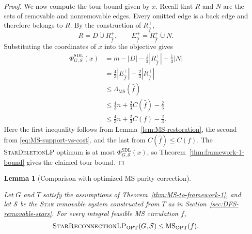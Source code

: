 \documentclass[11pt]{amsart}
\newcommand{\1}{\mathbbm{1}}
\newcommand{\MSopt}{\operatorname{MS}_{\mathrm{OPT}}}
\newcommand{\LPone}{\textsc{StarDeletionLP}}
\newcommand{\LPtwo}{\textsc{StarReconnectionLP}}
\newcommand{\PhiOne}{\Phi^{\mathrm{SDL}}}
\newtheorem{lemma}[theorem]{Lemma}
\begin{document}
\begin{proof}
We now compute the tour bound given by $x$.
Recall that $R$ and $N$ are the sets of removable and
nonremovable edges. Every omitted edge is a back edge and
therefore belongs to $R$. By the construction of
$R_{\widehat f}^+$,
\[
 R=D\mathbin{\dot\cup}R_{\widehat f}^+,
 \qquad
 E_{\widehat f}^+=R_{\widehat f}^+\mathbin{\dot\cup}N.
\]
Substituting the coordinates of $x$ into the objective gives
\begin{equation}
\label{eq:MS-exact-support-comparison}
\begin{aligned}
 \PhiOne_{G,\mathcal S}(x)
 &=m-|D|-\frac13|R_{\widehat f}^+|+\frac13|N|\\
 &=\frac43|E_{\widehat f}^+|-\frac23|R_{\widehat f}^+|\\
 &\le\Lambda_{\mathrm{MS}}(\widehat f)\\
 &\le\frac43n+\frac23C(\widehat f)-\frac23\\
 &\le\frac43n+\frac23C(f)-\frac23.
\end{aligned}
\end{equation}
Here the first inequality follows from
Lemma~\ref{lem:MS-restoration}, the second from
\eqref{eq:MS-support-vs-cost}, and the last from
$C(\widehat f)\le C(f)$.
The \LPone{} optimum is at most
$\PhiOne_{G,\mathcal S}(x)$, so
Theorem~\ref{thm:framework-1-bound} gives the claimed tour bound.
\end{proof}

\smallskip
\begin{lemma}[Comparison with optimized MS parity correction]
\label{lem:reconnection-MS-parity}

Let $G$ and $T$ satisfy the assumptions of
Theorem~\ref{thm:MS-to-framework-1}, and let $\mathcal S$ be
the \textsc{Star} removable system constructed from $T$
as in Section~\ref{sec:DFS-removable-stars}. For every integral
feasible MS circulation $f$,
\[
 \text{\LPtwo}_{\mathrm{OPT}}(G,\mathcal S)
 \le\MSopt(f).
\]
\end{lemma}
\end{document}
